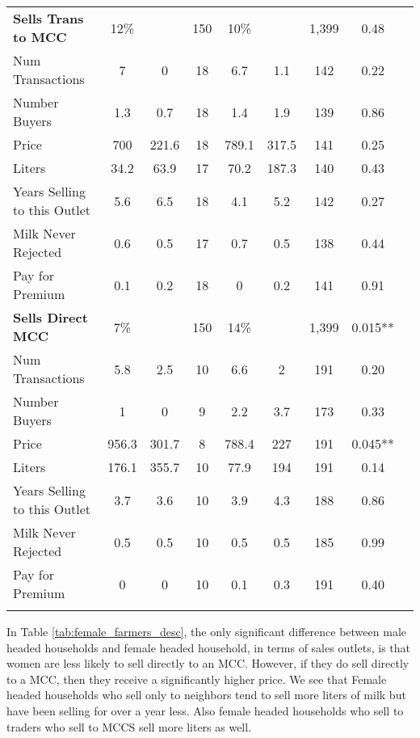 \documentclass[11pt,letter,draft]{article}
\newcommand{\mcl}{\multicolumn}
\begin{document}
\begin{table}[ht]
{\begin{tabular}{l*{1}{cccccccc}}
\textbf{Sells Trans to MCC}& 12\%& & 150& 10\% & &  1,399&  0.48 \\
Num Transactions&  7&  0&  18&  6.7&  1.1&  142&  0.22\\
Number Buyers&  1.3&  0.7&  18&  1.4&  1.9&  139&  0.86\\
Price&  700&  221.6&  18&  789.1&  317.5&  141&  0.25\\
Liters&  34.2&  63.9&  17&  70.2&  187.3&  140&  0.43\\
Years Selling to this Outlet&  5.6&  6.5&  18&  4.1&  5.2&  142& 0.27 \\
Milk Never Rejected&  0.6&  0.5&  17&  0.7&  0.5&  138& 0.44 \\
Pay for Premium&  0.1&  0.2&  18&  0&  0.2&  141&  0.91\\

\textbf{Sells Direct MCC}& 7\%& & 150& 14\% & &  1,399&  0.015**  \\
Num Transactions&  5.8&  2.5&  10&  6.6&  2&           191& 0.20\\
Number Buyers&  1&  0&  9&  2.2&  3.7&           173& 0.33\\
Price&  956.3&  301.7&  8&  788.4&  227&           191& 0.045**\\
Liters&  176.1&  355.7&  10&  77.9&  194&           191& 0.14\\
Years Selling to this Outlet&  3.7&  3.6&  10&  3.9&  4.3&           188&  0.86\\
Milk Never Rejected&  0.5&  0.5&  10&  0.5&  0.5&           185&  0.99\\
Pay for Premium&  0&  0&  10&  0.1&  0.3&           191& 0.40\\


\hline\hline
\mcl{7}{l}{
\footnotesize{
\parbox{20cm}{\vspace{2mm}\baselineskip=11pt}}}%
\end{tabular}
}
\end{table}



In Table \ref{tab:female_farmers_desc}, the only significant difference between male headed households and female headed household, in terms of sales outlets, is that women are less likely to sell directly to an MCC. However, if they do sell directly to a MCC, then they receive a significantly higher price. We see that Female headed households who sell only to neighbors tend to sell more liters of milk but have been selling for over a year less. Also female headed households who sell to traders who sell to MCCS sell more liters as well.
\end{document}
